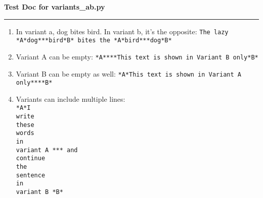 \documentclass [ngerman,12pt]{paper}
\begin{document}
\begin{center}
{\large\bf Test Doc for variants\_ab.py}\\[2mm]

\end{center}
\hrule
\medskip

\begin{enumerate}

\item In variant a, dog bites bird. In variant b, it's the opposite: \texttt{The lazy *A*dog***bird*B* bites the *A*bird***dog*B*}
\item Variant A can be empty: \texttt{*A****This text is shown in Variant B only*B*}
\item Variant B can be empty as well: \texttt{*A*This text is shown in Variant A only****B*}
\item Variants can include multiple lines:\\
\texttt{*A*I\\
write\\
these\\
words\\
in\\
variant A
***
and\\
continue\\
the\\
sentence\\
in\\
variant B
*B*}
\end{enumerate}
\end{document}
